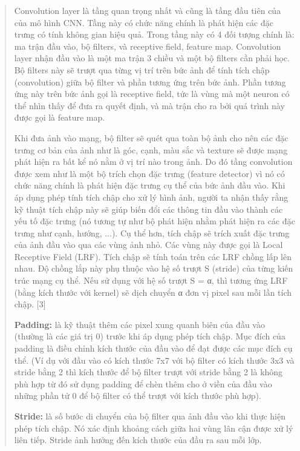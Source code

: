 \documentclass[
]{article}
\begin{document}
\begin{quote}
Convolution layer là tầng quan trọng nhất và cũng là tầng đầu tiên của
của mô hình CNN. Tầng này có chức năng chính là phát hiện các đặc trưng
có tính không gian hiệu quả. Trong tầng này có 4 đối tượng chính là: ma
trận đầu vào, bộ filters, và receptive field, feature map. Convolution
layer nhận đầu vào là một ma trận 3 chiều và một bộ filters cần phải
học. Bộ filters này sẽ trượt qua từng vị trí trên bức ảnh để tính tích
chập (convolution) giữa bộ filter và phần tương ứng trên bức ảnh. Phần
tương ứng này trên bức ảnh gọi là receptive field, tức là vùng mà một
neuron có thể nhìn thấy để đưa ra quyết định, và mà trận cho ra bởi quá
trình này được gọi là feature map.

Khi đưa ảnh vào mạng, bộ filter sẽ quét qua toàn bộ ảnh cho nên các đặc
trưng cơ bản của ảnh như là góc, cạnh, màu sắc và texture sẽ được mạng
phát hiện ra bất kể nó nằm ở vị trí nào trong ảnh. Do đó tầng
convolution được xem như là một bộ trích chọn đặc trưng (feature
detector) vì nó có chức năng chính là phát hiện đặc trưng cụ thể của bức
ảnh đầu vào. Khi áp dụng phép tính tích chập cho xử lý hình ảnh, người
ta nhận thấy rằng kỹ thuật tích chập này sẽ giúp biến đổi các thông tin
đầu vào thành các yếu tố đặc trưng (nó tương tự như bộ phát hiện nhằm
phát hiện ra các đặc trưng như cạnh, hướng, ...). Cụ thể hơn, tích chập
sẽ trích xuất đặc trưng của ảnh đầu vào qua các vùng ảnh nhỏ. Các vùng
này được gọi là Local Receptive Field (LRF). Tích chập sẽ tính toán trên
các LRF chồng lấp lên nhau. Độ chồng lắp này phụ thuộc vào hệ số trượt S
(stride) của từng kiến trúc mạng cụ thể. Nếu sử dụng với hệ số trượt S =
α, thì tương ứng LRF (bằng kích thước với kernel) sẽ dịch chuyển α đơn
vị pixel sau mỗi lần tích chập. {[}3{]}

\textbf{Padding:} là kỹ thuật thêm các pixel xung quanh biên của đầu vào
(thường là các giá trị 0) trước khi áp dụng phép tích chập. Mục đích của
padding là điều chỉnh kích thước của đầu vào để đạt được các mục đích cụ
thể. (Ví dụ với đầu vào có kích thước 7x7 với bộ filter có kích thước
3x3 và stride bằng 2 thì kích thước để bộ filter trượt với stride bằng 2
là không phù hợp từ đó sử dụng padding để chèn thêm cho ở viền của đầu
vào những phần tử 0 để bộ filter có thể trượt với kích thước phù hợp).

\textbf{Stride:} là số bước di chuyển của bộ filter qua ảnh đầu vào khi
thực hiện phép tích chập. Nó xác định khoảng cách giữa hai vùng lân cận
được xử lý liên tiếp. Stride ảnh hưởng đến kích thước của đầu ra sau mỗi
lớp.


\end{quote}
\end{document}

